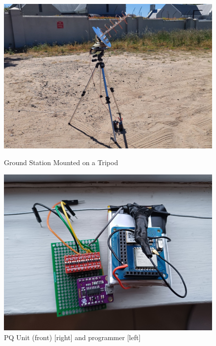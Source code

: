 \begin{figure}[!htb]
  \begin{minipage}{.55\textwidth}
    \centering
    \includegraphics[width=0.95\linewidth]{gsTripod}
    \caption{Ground Station Mounted on a Tripod}
    \label{fig:gsTripod}
  \end{minipage}
  \begin{minipage}{.44\textwidth}
    \centering
    \includegraphics[width=0.98\linewidth]{pqUnitPCB}
    \caption{PQ Unit (front) [right] and programmer [left]}
    \label{fig:pqUnitPCB}
  \end{minipage}
\end{figure}